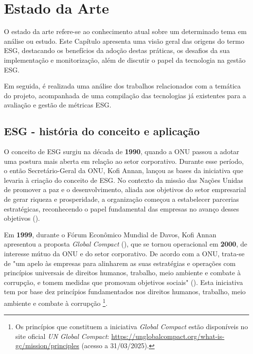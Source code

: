 \chapter{Estado da Arte}
\label{chap:EA}

O estado da arte refere-se ao conhecimento atual sobre um determinado tema em análise ou estudo. Este Capítulo apresenta uma visão geral das origens do termo \gls{ESG}, destacando os benefícios da adoção destas práticas, os desafios da sua implementação e monitorização, além de discutir o papel da tecnologia na gestão ESG.

Em seguida, é realizada uma análise dos trabalhos relacionados com a temática do projeto, acompanhada de uma compilação das tecnologias já existentes para a avaliação e gestão de métricas ESG.


\section{ESG - história do conceito e aplicação} 
\label{sec:OESG} 

O conceito de \gls{ESG} surgiu na década de \textbf{1990}, quando a \gls{ONU} passou a adotar uma postura mais aberta em relação ao setor corporativo. Durante esse período, o então Secretário-Geral da ONU, Kofi Annan, lançou as bases da iniciativa que levaria à criação do conceito de ESG. No contexto da missão das Nações Unidas de promover a paz e o desenvolvimento, aliada aos objetivos do setor empresarial de gerar riqueza e prosperidade, a organização começou a estabelecer parcerias estratégicas, reconhecendo o papel fundamental das empresas no avanço desses objetivos (\cite{Pollman2024}).

Em \textbf{1999}, durante o Fórum Econômico Mundial de Davos, Kofi Annan apresentou a proposta \textit{Global Compact} (\cite{Pollman2024}), que se tornou operacional em \textbf{2000}, de interesse mútuo da ONU e do setor corporativo. De acordo com a \gls{ONU}, trata-se de "um apelo às empresas para alinharem as suas estratégias e operações com princípios universais de direitos humanos, trabalho, meio ambiente e combate à corrupção, e tomem medidas que promovam objetivos sociais" (\cite{ONUGC2025}). Esta iniciativa tem por base dez princípios fundamentados nos direitos humanos, trabalho, meio ambiente e combate à corrupção \footnote{Os princípios que constituem a iniciativa \textit{Global Compact} estão disponíveis no site oficial \textit{UN Global Compact}: \url{https://unglobalcompact.org/what-is-gc/mission/principles} (acesso a 31/03/2025).}.

